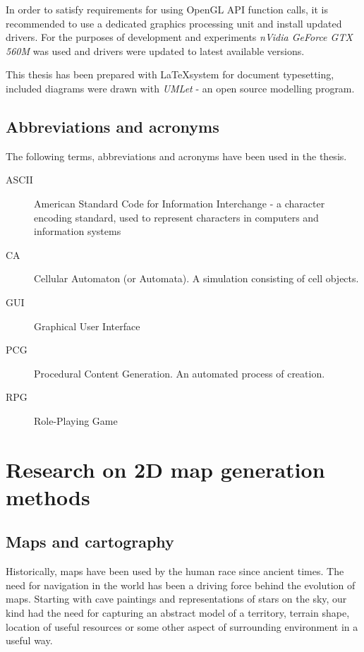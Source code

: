 \documentclass[12pt]{report}
\begin{document}
In order to satisfy requirements for using OpenGL API function calls, it is recommended to use a dedicated graphics processing unit and install updated drivers. For the purposes of development and experiments \textit{nVidia GeForce GTX 560M } was used and drivers were updated to latest available versions.
 
This thesis has been prepared with \LaTeX\space system for document typesetting, included diagrams were drawn with \textit{UMLet} - an open source modelling program.
 

\section{Abbreviations and acronyms} 

The following terms, abbreviations and acronyms have been used in the thesis.
 
\begin{description} 
	\item[ASCII] American Standard Code for Information Interchange - a character encoding standard, used to represent characters in computers and information systems
	\item[CA] Cellular Automaton (or Automata). A simulation consisting of cell objects.
	\item[GUI] Graphical User Interface
	\item[PCG] Procedural Content Generation. An automated process of creation.   
	\item[RPG] Role-Playing Game 
\end{description}

\chapter{Research on 2D map generation methods} \label{rozdzial.teoria}

\section{Maps and cartography} 

Historically, maps have been used by the human race since ancient times. The need for navigation in the world has been a driving force behind the evolution of maps. Starting with cave paintings and representations of stars on the sky, our kind had the need for capturing an abstract model of a territory, terrain shape, location of useful resources or some other aspect of surrounding environment in a useful way.
\end{document}
